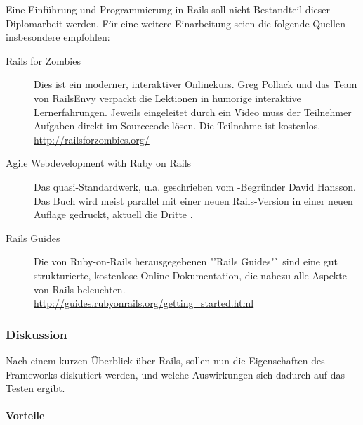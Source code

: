 Eine Einführung und Programmierung in Rails soll nicht Bestandteil dieser Diplomarbeit werden. Für eine weitere Einarbeitung seien die folgende Quellen insbesondere empfohlen:
\begin{description}
 \item[Rails for Zombies] Dies ist ein moderner, interaktiver Onlinekurs. Greg Pollack und das Team von RailsEnvy verpackt die Lektionen in humorige interaktive Lernerfahrungen. Jeweils eingeleitet durch ein Video muss der Teilnehmer Aufgaben direkt im Sourcecode lösen. Die Teilnahme ist kostenlos.\\
 \url{http://railsforzombies.org/}
 \item[Agile Webdevelopment with Ruby on Rails] Das quasi-Standardwerk, u.a. geschrieben vom -Begründer David Hansson. Das Buch wird meist parallel mit einer neuen Rails-Version in einer neuen Auflage gedruckt, aktuell die Dritte \citep{ruby_agile_2009}.
 \item[Rails Guides] Die von Ruby-on-Rails herausgegebenen "'Rails Guides"` sind eine gut strukturierte, kostenlose Online-Dokumentation, die nahezu alle Aspekte von Rails beleuchten.\\
 \url{http://guides.rubyonrails.org/getting_started.html}
 \end{description}



\subsubsection{Diskussion}
Nach einem kurzen Überblick über Rails, sollen nun die Eigenschaften des Frameworks diskutiert werden, und welche Auswirkungen sich dadurch auf das Testen ergibt.
\paragraph{Vorteile}

